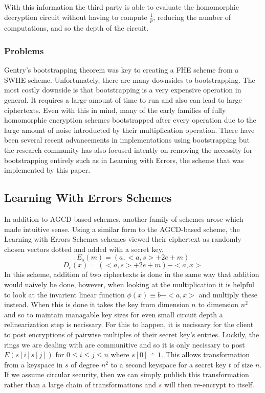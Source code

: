 \documentclass[letterpaper,twocolumn,10pt]{article}
\begin{document}
With this information the third party is able to evaluate the homomorphic decryption circuit without having to compute $\frac{1}{p}$, reducing the number of computations, and so the depth of the circuit.

\subsubsection{Problems}
Gentry's bootstrapping theorem was key to creating a FHE scheme from a SWHE scheme. Unfortunately, there are many downsides to bootstrapping. The most costly downside is that bootstrapping is a very expensive operation in general. It requires a large amount of time to run\cite{ImplementingGentry} and also can lead to large ciphertexts\cite{NEEDED}. Even with this in mind, many of the early families of fully homomorphic encryption schemes bootstrapped after every operation due to the large amount of noise introducted by their multiplication operation\cite{NEEDED}. There have been several recent advancements in implementations using bootstrapping\cite{StehleSteinfeld, SmartVercuteren, ImplementingGentry, CNT} but the research community has also focused intently on removing the necessity for bootstrapping entirely such as in Learning with Errors, the scheme that was implemented by this paper.

\subsection{Learning With Errors Schemes}
In addition to AGCD-based schemes, another family of schemes arose which made intuitive sense. Using a similar form to the AGCD-based scheme, the Learning with Errors Schemes\cite{SansBootstrapping} schemes viewed their ciphertext as randomly chosen vectors dotted and added with a secret key.
$$E_s(m) = (a, <a,s> + 2e + m)$$
$$D_c(x) = (<a,s> + 2e + m) - <a,x>$$
In this scheme, addition of two ciphertexts is done in the same way that addition would naively be done, however, when looking at the multiplication it is helpful to look at the invarient linear function $\phi(x) \equiv b - <a,x>$ and multiply these instead. When this is done it takes the key from dimension $n$ to dimension $n^2$ and so to maintain managable key sizes for even small circuit depth a relinearization step is necissary. For this to happen, it is necissary for the client to post encryptions of pairwise multiples of their secret key's entries. Luckily, the rings we are dealing with are communitive and so it is only necissary to post $E(s[i]s[j])$ for $0 \leq i \leq j \leq n$ where $s[0] \doteq 1$. This allows transformation from a keyspace in $s$ of degree $n^2$ to a second keyspace for a secret key $t$ of size $n$. If we assume circular security, then we can simply publish this transformation rather than a large chain of transformations and $s$ will then re-encrypt to itself.
\end{document}
